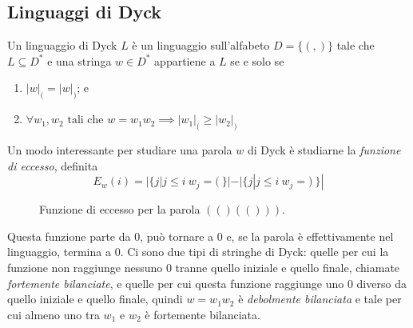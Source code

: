 \subsection{Linguaggi di Dyck}
Un linguaggio di Dyck $L$ è un linguaggio sull'alfabeto $D=\{(,)\}$ tale che $L \subseteq D^*$
e una stringa $w \in D^*$ appartiene a $L$ se e solo se
\begin{enumerate}
	\item $|w|_{(} = |w|_{)}$; e
	\item $\forall w_1, w_2 \text{ tali che } w = w_1w_2 \implies|w_1|_{(} \geq |w_2|_{)}$
\end{enumerate}
Un modo interessante per studiare una parola $w$ di Dyck è studiarne la
\textit{funzione di eccesso}, definita
$$
	E_w(i) = |\{j | j \le i ~ w_j = ( ~\}| - |\{j | j \leq i ~ w_j = ) ~\}|
$$
\begin{figure}[h]
	\centering
	\caption{Funzione di eccesso per la parola $(()(()))$.}
	\label{fig:func_excess}
\end{figure}

Questa funzione parte da $0$, può tornare a $0$ e, se la parola è effettivamente nel
linguaggio, termina a $0$. Ci sono due tipi di stringhe di Dyck: quelle per cui
la funzione non raggiunge nessuno $0$ tranne quello iniziale e quello finale,
chiamate \textit{fortemente bilanciate}, e quelle per cui questa funzione raggiunge
uno $0$ diverso da quello iniziale e quello finale, quindi $w = w_1w_2$ è
\textit{debolmente bilanciata} e tale per cui almeno uno tra $w_1$ e $w_2$ è
fortemente bilanciata.

